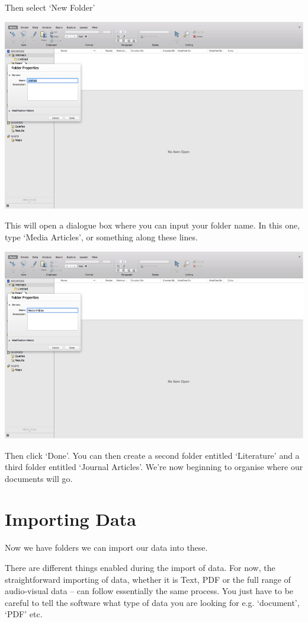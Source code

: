 \documentclass[]{book}
\theoremstyle{definition}
\theoremstyle{definition}
\theoremstyle{definition}
\theoremstyle{remark}
\begin{document}
Then select `New Folder'

\includegraphics{imgs/qual_11.png}

This will open a dialogue box where you can input your folder name. In
this one, type `Media Articles', or something along these lines.

\includegraphics{imgs/qual_12.png}

Then click `Done'. You can then create a second folder entitled
`Literature' and a third folder entitled `Journal Articles'. We're now
beginning to organise where our documents will go.

\hypertarget{importing-data}{%
\section{Importing Data}\label{importing-data}}

Now we have folders we can import our data into these.

There are different things enabled during the import of data. For now,
the straightforward importing of data, whether it is Text, PDF or the
full range of audio-visual data -- can follow essentially the same
process. You just have to be careful to tell the software what type of
data you are looking for e.g. `document', `PDF' etc.
\end{document}
